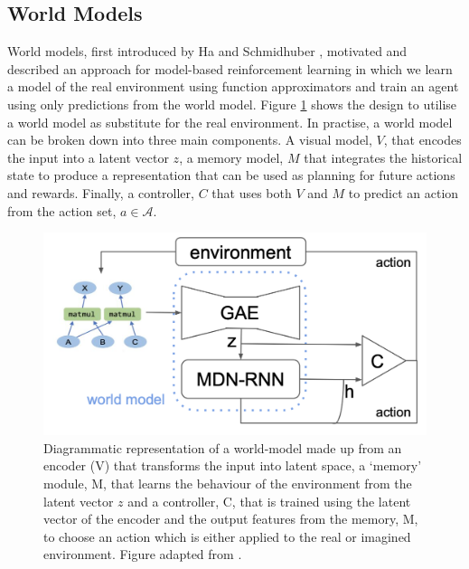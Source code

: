 \subsection{World Models}
World models, first introduced by Ha and Schmidhuber \cite{ha2018worldmodels}, motivated and described an approach for model-based reinforcement learning in which we learn a model of the real environment using function approximators and train an agent using only predictions from the world model. Figure \ref{fig:bg:mb-rl} shows the design to utilise a world model as substitute for the real environment. In practise, a world model can be broken down into three main components. A visual model, $V$, that encodes the input into a latent vector $z$, a memory model, $M$ that integrates the historical state to produce a representation that can be used as planning for future actions and rewards. Finally, a controller, $C$ that uses both $V$ and $M$ to predict an action from the action set, $a \in \mathcal{A}$.

\begin{figure}[ht]
  \centering
  \includegraphics[width=0.75\columnwidth]{sections/2background/images/mb-rl}
  \caption[Model-based Reinforcement Learning End-To-End System]{Diagrammatic representation of a world-model made up from an encoder (V) that transforms the input into latent space, a `memory' module, M, that learns the behaviour of the environment from the latent vector $z$ and a controller, C, that is trained using the latent vector of the encoder and the output features from the memory, M, to choose an action which is either applied to the real or imagined environment. Figure adapted from \cite{ha2018worldmodels}.}
  \label{fig:bg:mb-rl}
\end{figure}

